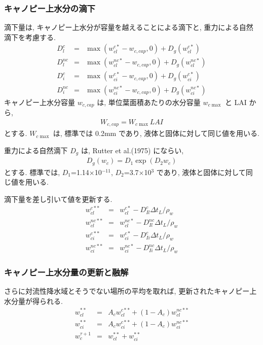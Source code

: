 \subsubsection{キャノピー上水分の滴下}

滴下量は, キャノピー上水分が容量を越えることによる滴下と, 重力による自然
滴下を考慮する. 
\begin{eqnarray}
 D_l^c    & = & \max( w_{cl}^{c*} - w_{c,cap}, 0 ) + D_{g}(w_{cl}^{c*}) \\
 D_l^{nc} & = & \max( w_{cl}^{nc*}- w_{c,cap}, 0 ) + D_{g}(w_{cl}^{nc*}) \\
 D_i^c    & = & \max( w_{ci}^{c*} - w_{c,cap}, 0 ) + D_{g}(w_{ci}^{c*}) \\
 D_i^{nc} & = & \max( w_{ci}^{nc*}- w_{c,cap}, 0 ) + D_{g}(w_{ci}^{nc*})
\end{eqnarray}
キャノピー上水分容量 $w_{c,cap}$ は, 単位葉面積あたりの水分容量
$w_{c\max}$ と LAI から, 
\begin{eqnarray}
 W_{c,cap} = W_{c\max} LAI 
\end{eqnarray}
とする. 
$W_{c\max}$ は, 標準では 0.2mm であり, 液体と固体に対して同じ値を用いる. 

重力による自然滴下 $D_g$ は, Rutter et al.(1975) にならい, 
\begin{eqnarray}
 D_g(w_c) = D_1 \exp(D_2 w_c)
\end{eqnarray}
とする. 標準では, $D_1$=1.14$\times$10$^{-11}$,
$D_2$=3.7$\times$10$^{3}$ であり, 液体と固体に対して同じ値を用いる. 

滴下量を差し引いて値を更新する. 
\begin{eqnarray}
 w_{cl}^{c**} &=& w_{cl}^{c*}  - D_{Il}^c    \Delta t_L / \rho_w \\
 w_{cl}^{nc**}&=& w_{cl}^{nc*} - D_{Il}^{nc} \Delta t_L / \rho_w \\
 w_{ci}^{c**} &=& w_{ci}^{c*}  - D_{Ii}^c    \Delta t_L / \rho_w \\
 w_{ci}^{nc**}&=& w_{ci}^{nc*} - D_{Ii}^{nc} \Delta t_L / \rho_w 
\end{eqnarray}

\subsubsection{キャノピー上水分量の更新と融解}

さらに対流性降水域とそうでない場所の平均を取れば, 更新されたキャノピー上
水分量が得られる. 
\begin{eqnarray}
 w_{cl}^{**} &=& A_c w_{cl}^{c**} + (1-A_c) w_{cl}^{nc**} \\
 w_{ci}^{**} &=& A_c w_{ci}^{c**} + (1-A_c) w_{ci}^{nc**} \\
 w_c^{\tau+1} &=& w_{cl}^{**} + w_{ci}^{**}
\end{eqnarray}

